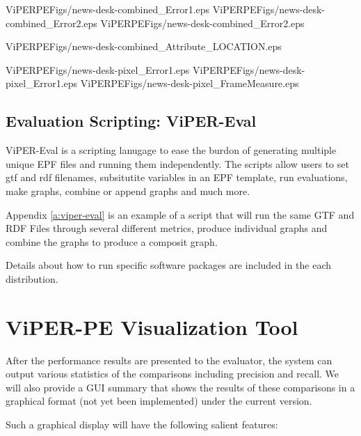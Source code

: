 \begin{put2-1fig}{ViPERPEFigs/news-desk-combined_Error1.eps}
{ViPERPEFigs/news-desk-combined_Error2.eps}
{ViPERPEFigs/news-desk-combined_Error2.eps}
\caption{Examples of Bar Chart for Normal Runs}
\label{f:graph1}
\end{put2-1fig}

\begin{putfig}{ViPERPEFigs/news-desk-combined_Attribute_LOCATION.eps}
\caption{Example of Distance Graph}
\label{f:graph2}
\end{putfig}


\begin{put2-1fig}{ViPERPEFigs/news-desk-pixel_Error1.eps}
{ViPERPEFigs/news-desk-pixel_Error1.eps}
{ViPERPEFigs/news-desk-pixel_FrameMeasure.eps}
\caption{Example of Pixel and Frame Graphs}
\label{f:graph3}
\end{put2-1fig}


\subsection{Evaluation Scripting: ViPER-Eval}

ViPER-Eval is a scripting lanugage to ease the burdon of generating
multiple unique EPF files and running them independently.  The scripts
allow users to set gtf and rdf filenames, subsitutite variables in an
EPF template, run evaluations, make graphs, combine or append graphs
and much more.

Appendix \ref{a:viper-eval} is an example of a script that will run
the same GTF and RDF Files through several different metrics, produce
individual graphs and combine the graphs to produce a composit graph.

Details about how to run specific software packages are included in
the each distribution.

\section{ViPER-PE Visualization Tool}

After the performance results are presented to the evaluator, the
system can output various statistics of the comparisons including
precision and recall.  We will also provide a GUI summary that shows
the results of these comparisons in a graphical format (not yet been
implemented) under the current version.

Such a graphical display will have the following salient features:

